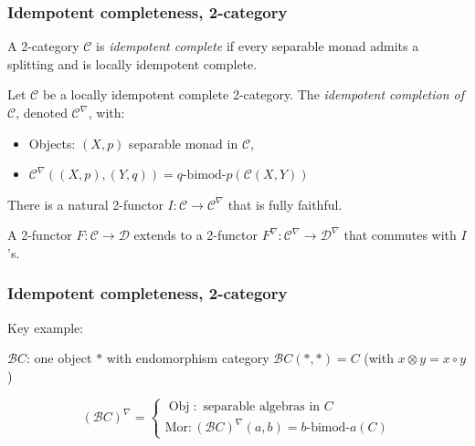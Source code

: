 \documentclass{beamer}
\newcommand{\tnsr}{\otimes}
\DeclareMathOperator{\Obj}{Obj}
\newcommand{\cB}{{\mathcal{B}}}
\newcommand{\cC}{{\mathcal{C}}}
\newcommand{\cD}{{\mathcal{D}}}
\newcommand{\bimod}[2]{{#1\textrm{-bimod-}#2}}
\begin{document}
\begin{frame}
\frametitle{Idempotent completeness, 2-category}

\begin{definition}
A 2-category $\cC$ is \emph{idempotent complete}
if every separable monad admits a splitting
and is locally idempotent complete.
\end{definition}

\pause

\begin{definition}
Let $\cC$ be a locally idempotent complete 2-category.
The \emph{idempotent completion of $\cC$},
denoted $\cC^\nabla$, with:
\begin{itemize}
\item Objects: $(X,p)$ separable monad in $\cC$,
\item $\cC^\nabla((X,p),(Y,q)) = \bimod{q}{p}(\cC(X,Y))$
\end{itemize}

\pause

There is a natural 2-functor $I: \cC \to \cC^\nabla$
that is fully faithful.

\pause

A 2-functor $F: \cC \to \cD$
extends to a 2-functor $F^\nabla: \cC^\nabla \to \cD^\nabla$
that commutes with $I$'s.
\end{definition}

\end{frame}

\begin{frame}
\frametitle{Idempotent completeness, 2-category}

Key example:

$\cB C$: one object $*$ with endomorphism category
$\cB C(*,*) = C$
(with $x \tnsr y = x \circ y$)

\[
(\cB C)^\nabla =
\begin{cases}
	\Obj: \text{ separable algebras in } C
	\\
	\text{Mor}: (\cB C)^\nabla (a,b) = \bimod{b}{a}(C)
\end{cases}
\]


\end{frame}
\end{document}
